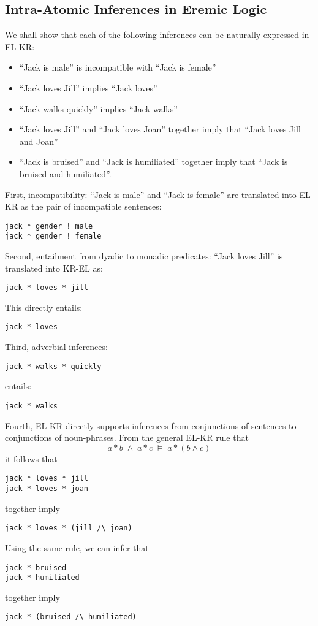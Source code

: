 \subsection{Intra-Atomic Inferences in Eremic Logic}
We shall show that each of the following inferences can be naturally expressed in EL-KR:
\begin{itemize}
\item
``Jack is male'' is incompatible with ``Jack is female''
\item
``Jack loves Jill'' implies ``Jack loves''
\item
``Jack walks quickly'' implies ``Jack walks''
\item
``Jack loves Jill'' and ``Jack loves Joan'' together imply that ``Jack loves Jill and Joan''
\item
``Jack is bruised'' and ``Jack is humiliated'' together imply that ``Jack is bruised and humiliated''.
\end{itemize}
First, incompatibility: ``Jack is male'' and ``Jack is female'' are translated into EL-KR as the pair of incompatible sentences:
\begin{verbatim}
jack * gender ! male
jack * gender ! female
\end{verbatim}
Second, entailment from dyadic to monadic predicates:
``Jack loves Jill'' is translated into KR-EL as:
\begin{verbatim}
jack * loves * jill
\end{verbatim}
This directly entails:
\begin{verbatim}
jack * loves
\end{verbatim}
Third, adverbial inferences: 
\begin{verbatim}
jack * walks * quickly
\end{verbatim}
entails:
\begin{verbatim}
jack * walks
\end{verbatim}
Fourth, EL-KR directly supports inferences from conjunctions of sentences to conjunctions of noun-phrases.
From the general EL-KR rule that
\[
a \ast b \; \land \; a \ast c \; \models \; a \ast (b \land c)
\]
it follows that 
\begin{verbatim}
jack * loves * jill
jack * loves * joan
\end{verbatim}
together imply
\begin{verbatim}
jack * loves * (jill /\ joan)
\end{verbatim}
Using the same rule, we can infer that
\begin{verbatim}
jack * bruised
jack * humiliated
\end{verbatim}
together imply
\begin{verbatim}
jack * (bruised /\ humiliated)
\end{verbatim}
 
